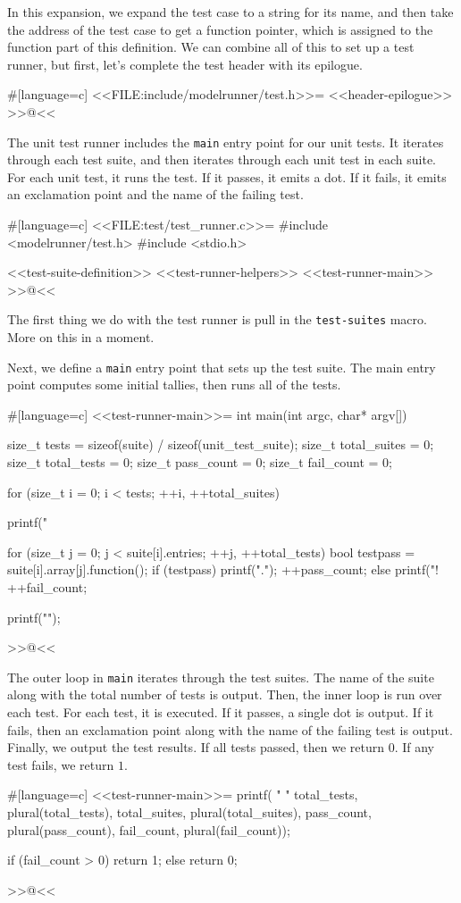 In this expansion, we expand the test case to a string for its name, and then
take the address of the test case to get a function pointer, which is assigned
to the function part of this definition. We can combine all of this to set up a
test runner, but first, let's complete the test header with its epilogue.

#[language=c]
<<FILE:include/modelrunner/test.h>>=
<<header-epilogue>>
>>@<<

The unit test runner includes the \verb/main/ entry point for our unit tests. It
iterates through each test suite, and then iterates through each unit test in
each suite. For each unit test, it runs the test. If it passes, it emits a dot.
If it fails, it emits an exclamation point and the name of the failing test.

#[language=c]
<<FILE:test/test_runner.c>>=
#include <modelrunner/test.h>
#include <stdio.h>

<<test-suite-definition>>
<<test-runner-helpers>>
<<test-runner-main>>
>>@<<

The first thing we do with the test runner is pull in the \verb/test-suites/
macro.  More on this in a moment.

Next, we define a \verb/main/ entry point that sets up the test suite. The main
entry point computes some initial tallies, then runs all of the tests.

#[language=c]
<<test-runner-main>>=
int main(int argc, char* argv[])
{
    size_t tests = sizeof(suite) / sizeof(unit_test_suite);
    size_t total_suites = 0;
    size_t total_tests = 0;
    size_t pass_count = 0;
    size_t fail_count = 0;

    for (size_t i = 0; i < tests; ++i, ++total_suites)
    {
        printf("%

        for (size_t j = 0; j < suite[i].entries; ++j, ++total_tests)
        {
            bool testpass = suite[i].array[j].function();
            if (testpass)
            {
                printf(".");
                ++pass_count;
            }
            else
            {
                printf("!%
                ++fail_count;
            }
        }

        printf("\n");
    }
>>@<<

The outer loop in \verb/main/ iterates through the test suites. The name of the
suite along with the total number of tests is output. Then, the inner loop is
run over each test. For each test, it is executed. If it passes, a single dot is
output. If it fails, then an exclamation point along with the name of the
failing test is output.  Finally, we output the test results.  If all tests
passed, then we return $0$. If any test fails, we return $1$.

#[language=c]
<<test-runner-main>>=
    printf(
        "\nRan %
        "%
        total_tests, plural(total_tests), total_suites, plural(total_suites),
        pass_count, plural(pass_count), fail_count, plural(fail_count));

    if (fail_count > 0)
        return 1;
    else
        return 0;
}
>>@<<

